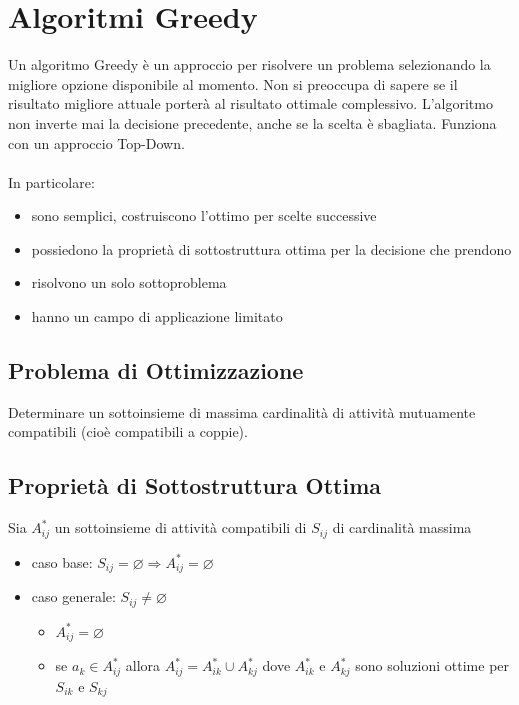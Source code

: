 \section{Algoritmi Greedy}
Un algoritmo Greedy è un approccio per risolvere un problema selezionando la migliore opzione disponibile al momento. Non si preoccupa di sapere se il risultato migliore attuale porterà al risultato ottimale complessivo. L'algoritmo non inverte mai la decisione precedente, anche se la scelta è sbagliata. Funziona con un approccio Top-Down. \\~\\
In particolare:
\begin{itemize}
    \item sono semplici, costruiscono l’ottimo per scelte successive
    \item possiedono la proprietà di sottostruttura ottima per la decisione che prendono
    \item risolvono un solo sottoproblema
    \item hanno un campo di applicazione limitato
\end{itemize}

\subsection{Problema di Ottimizzazione}
Determinare un sottoinsieme di massima cardinalità di attività mutuamente compatibili (cioè compatibili a coppie).

\subsection{Proprietà di Sottostruttura Ottima}
Sia $A_{ij}^*$ un sottoinsieme di attività compatibili di $S_{ij}$ di cardinalità massima
\begin{itemize}
    \item caso base: $S_{ij} = \varnothing \Rightarrow A_{ij}^* = \varnothing$
    \item caso generale: $S_{ij} \not= \varnothing$
    \begin{itemize}
        \item $A_{ij}^* = \varnothing$
        \item se $a_k \in A_{ij}^*$ allora $A_{ij}^* = A_{ik}^* \cup A_{kj}^*$ dove $A_{ik}^*$ e $A_{kj}^*$ sono soluzioni ottime per $S_{ik}$ e $S_{kj}$
    \end{itemize}  
\end{itemize}

